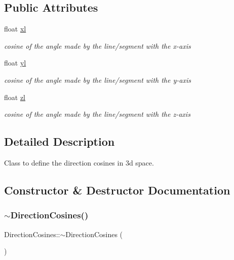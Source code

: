 \subsection*{Public Attributes}
\begin{DoxyCompactItemize}
\item 
float \mbox{\hyperlink{class_direction_cosines_a6fde43a3e699635fecf3296c72fe7045}{xl}}
\begin{DoxyCompactList}\small\item\em cosine of the angle made by the line/segment with the x-\/axis \end{DoxyCompactList}\item 
float \mbox{\hyperlink{class_direction_cosines_a277b009af5e287e276d445a6aecef108}{yl}}
\begin{DoxyCompactList}\small\item\em cosine of the angle made by the line/segment with the y-\/axis \end{DoxyCompactList}\item 
float \mbox{\hyperlink{class_direction_cosines_afb263bbd031ba13d68380e367403ec65}{zl}}
\begin{DoxyCompactList}\small\item\em cosine of the angle made by the line/segment with the z-\/axis \end{DoxyCompactList}\end{DoxyCompactItemize}


\subsection{Detailed Description}
Class to define the direction cosines in 3d space. 

\subsection{Constructor \& Destructor Documentation}
\mbox{\label{class_direction_cosines_a595e87c5e381f0d877eee26ba75283c7}} 
\subsubsection{\texorpdfstring{$\sim$\+Direction\+Cosines()}{~DirectionCosines()}}
{\footnotesize\ttfamily Direction\+Cosines\+::$\sim$\+Direction\+Cosines (\begin{DoxyParamCaption}{ }\end{DoxyParamCaption})}



